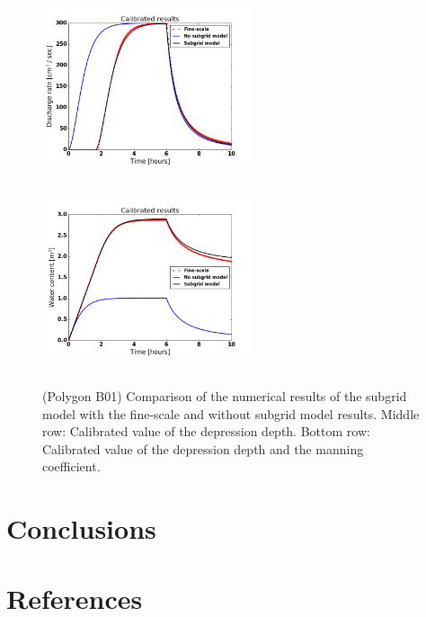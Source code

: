 \documentclass[review,11pt]{elsarticle}
\begin{document}
\begin{figure}[!h]
\includegraphics[width=6.2cm, height=5.5cm]{./figures/POLYGON_B01/POLYGON_B01dischargeCalibDDManning.png}
\includegraphics[width=6.2cm, height=5.5cm]{./figures/POLYGON_B01/POLYGON_B01watercontentCalibDDManning.png}
\caption{(Polygon B01) Comparison of the numerical results of the subgrid model with the fine-scale and without subgrid model results. Middle row: Calibrated value of the depression depth. Bottom row: Calibrated value of the depression depth and the manning coefficient.}
\label{polygon-B01}
\end{figure}


\section{Conclusions}\label{conclusion}

\section*{References}


\end{document}
